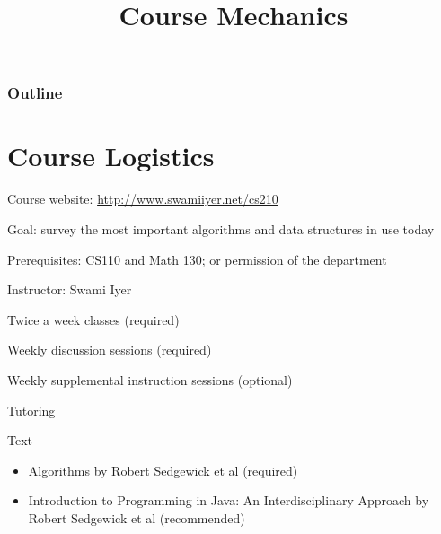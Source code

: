 \documentclass[8pt,a4paper,compress]{beamer}
\title{Course Mechanics}
\date{}
\begin{document}
\begin{frame}
\vfill
\titlepage
\end{frame}

\begin{frame}
\frametitle{Outline}
\tableofcontents
\end{frame}

\section{Course Logistics}
\begin{frame}[fragile]
\pause

Course website: \href{http://www.swamiiyer.net/cs210}{http://www.swamiiyer.net/cs210}

\pause
\bigskip

Goal: survey the most important algorithms and data structures in use today

\pause
\bigskip

Prerequisites: CS110 and Math 130; or permission of the department

\pause
\bigskip

Instructor: Swami Iyer

\pause
\bigskip

Twice a week classes (required)

\pause
\bigskip
Weekly discussion sessions (required)

\pause
\bigskip

Weekly supplemental instruction sessions (optional)

\pause
\bigskip

Tutoring

\pause
\bigskip

Text
\begin{itemize}
\item Algorithms by Robert Sedgewick et al (required)
\item Introduction to Programming in Java: An Interdisciplinary Approach  by Robert Sedgewick et al (recommended)
\end{itemize}
\end{frame}
\end{document}
